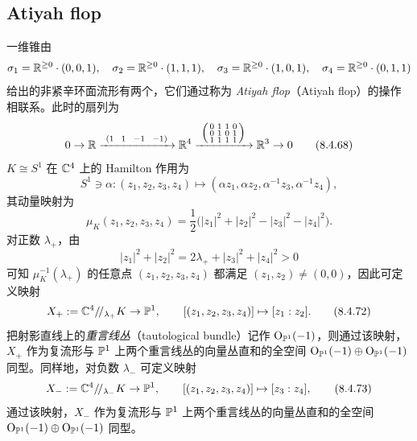\subsection{Atiyah flop}

一维锥由
\[
  \sigma_1=\mathbb{R}^{\ge 0}\cdot(0,0,1),\quad \sigma_2=\mathbb{R}^{\ge 0}\cdot(1,1,1),\quad
  \sigma_3=\mathbb{R}^{\ge 0}\cdot(1,0,1),\quad \sigma_4=\mathbb{R}^{\ge 0}\cdot(0,1,1)
\]
给出的非紧辛环面流形有两个，它们通过称为 \emph{Atiyah flop}（Atiyah flop）的操作相联系。此时的扇列为
\begin{equation}
  0\to\R\xrightarrow{\ (1\ \ 1\ \ -1\ \ -1)\ }\R^4
  \xrightarrow{\ \left(\begin{smallmatrix}0&1&1&0\\0&1&0&1\\1&1&1&1\end{smallmatrix}\right)\ }\R^3\to 0 \tag{8.4.68}
\end{equation}
$K\cong S^1$ 在 $\mathbb{C}^4$ 上的 Hamilton 作用为
\begin{equation}
  S^1\ni\alpha\colon(z_1,z_2,z_3,z_4)\mapsto(\alpha z_1,\alpha z_2,\alpha^{-1}z_3,\alpha^{-1}z_4), \tag{8.4.69}
\end{equation}
其动量映射为
\begin{equation}
  \mu_K(z_1,z_2,z_3,z_4)=\frac{1}{2}\bigl(|z_1|^2+|z_2|^2-|z_3|^2-|z_4|^2\bigr). \tag{8.4.70}
\end{equation}
对正数 $\lambda_+$，由
\begin{equation}
  |z_1|^2+|z_2|^2=2\lambda_++|z_3|^2+|z_4|^2>0 \tag{8.4.71}
\end{equation}
可知 $\mu_K^{-1}(\lambda_+)$ 的任意点 $(z_1,z_2,z_3,z_4)$ 都满足 $(z_1,z_2)\ne(0,0)$，因此可定义映射
\begin{equation}
  X_+:=\mathbb{C}^4/\!/_{\lambda_+}K\to\mathbb{P}^1,\qquad [(z_1,z_2,z_3,z_4)]\mapsto[z_1:z_2]. \tag{8.4.72}
\end{equation}
把射影直线上的\emph{重言线丛}（tautological bundle）记作 $\operatorname{O}_{\mathbb{P}^1}(-1)$，则通过该映射，$X_+$ 作为复流形与 $\mathbb{P}^1$ 上两个重言线丛的向量丛直和的全空间 $\operatorname{O}_{\mathbb{P}^1}(-1)\oplus\operatorname{O}_{\mathbb{P}^1}(-1)$ 同型。同样地，对负数 $\lambda_-$ 可定义映射
\begin{equation}
  X_-:=\mathbb{C}^4/\!/_{\lambda_-}K\to\mathbb{P}^1,\qquad [(z_1,z_2,z_3,z_4)]\mapsto[z_3:z_4], \tag{8.4.73}
\end{equation}
通过该映射，$X_-$ 作为复流形与 $\mathbb{P}^1$ 上两个重言线丛的向量丛直和的全空间 $\operatorname{O}_{\mathbb{P}^1}(-1)\oplus\operatorname{O}_{\mathbb{P}^1}(-1)$ 同型。



